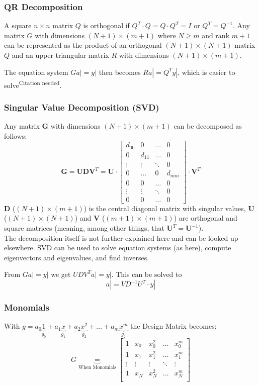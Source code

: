 \subsubsection{QR Decomposition}
A square $n \times n$ matrix $Q$ is orthogonal if $Q^T \cdot Q = Q \cdot Q^T = I$ or $Q^T = Q^{-1}$.
Any matrix $G$ with dimensions $(N+1) \times (m+1)$ where $N \geq m$ and rank $m+1$ can be represented as the product of an orthogonal $(N+1)\times(N+1)$ matrix $Q$ and an upper triangular matrix $R$ with dimensions $(N+1)\times(m+1)$.

The equation system $Ga| = y|$ then becomes $Ra|=Q^Ty|$, which is easier to solve\textsuperscript{Citation needed}.

\subsubsection{Singular Value Decomposition (SVD)}
Any matrix $\bm G$ with dimensions $(N+1) \times (m+1)$ can be decomposed as follows:
$$\bm G = \bm U \bm D \bm V^T = \bm U \cdot \begin{bmatrix}
  d_{00} & 0      & \ldots & 0\\
  0      & d_{11} & \ldots & 0\\
  \vdots & \vdots & \ddots & 0\\
  0      & \ldots & 0      & d_{mm}\\
  0      & 0      & \ldots & 0\\
  \vdots & \vdots & \ddots & 0\\
  0      & 0      & \ldots & 0
\end{bmatrix} \cdot \bm V^T$$
$\bm D$ ($(N+1) \times (m+1)$) is the central diagonal matrix with singular values,
$\bm U$ ($(N+1) \times (N+1)$) and $\bm V$ ($(m+1) \times (m+1)$) are orthogonal and square
matrices (meaning, among other things, that $\bm U^T = \bm U^{-1}$).\\

The decomposition itself is not further explained here and can be looked up elsewhere.
SVD can be used to solve equation systems (as here), compute eigenvectors and eigenvalues,
and find inverses.

From $Ga| = y|$ we get $UDV^T a| = y|$. This can be solved to
\[
    a| = V D^{-1}U^T \cdot y|
\]

\subsubsection{Monomials} \label{sssec:ls_monomiale}
With
$g = a_0 \underbrace{1}_{g_0} + a_1 \underbrace{x}_{g_1} + a_2 \underbrace{x^2}_{g_2} +\ldots + a_m \underbrace{x^m}_{g_2}$
the Design Matrix becomes:
\[G \underbrace{=}_{\text{When Monomials}}
\begin{bmatrix}
  1 & x_0 & x_0^2  & \ldots & x_0^m\\
  1 & x_1 & x_1^2  & \ldots & x_1^m\\
  \vdots  & \vdots & \vdots  & \ddots & \vdots\\
  1 & x_N & x_N^2  & \ldots & x_N^m\\
\end{bmatrix}\]



